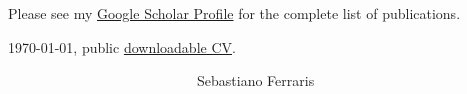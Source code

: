 \documentclass[10pt,A4,english]{article}
\begin{document}
\begin{paracol}{2}
\begin{rightcolumn}
\begin{itemize}[leftmargin=*]
\end{itemize}
\mbox{}
\vfill
Please see my \href{https://scholar.google.com/citations?user=1tAeAI0AAAAJ&hl=en}{Google Scholar Profile} for the complete list of publications.
\mbox{}
\vfill
\mbox{}
\vfill
\mbox{}
\vfill
\mbox{}
\vfill
\mbox{}
\vfill
\mbox{}
\vfill
\mbox{}
\vfill
\mbox{}
\vfill
\mbox{}
\vfill
\mbox{}
\vfill
\mbox{}
\vfill
\mbox{}
\vfill
\mbox{}
\vfill
\mbox{}
\vfill
\mbox{}


\today, public \href{https://sebastianof.github.io/GeoDsBlog/about/CV_modern/curriculum.pdf}{downloadable CV}. \hspace{1cm}   \hrulefill

\hspace*{30mm}\phantom{Lorem, \today }~~~~~~~~~~~~~~~~~~~~~~~~~~~Sebastiano Ferraris

\end{rightcolumn}
\end{paracol}
\end{document}
